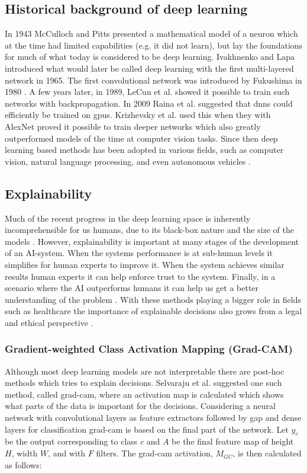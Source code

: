 \subsection{Historical background of deep learning} \label{sec:dl-history}
In 1943 McCulloch and Pitts \cite{McCulloch1943} presented a mathematical model of a neuron which at the time had limited capabilities (e.g. it did not learn), but lay the foundations for much of what today is considered to be deep learning. Ivakhnenko and Lapa \cite{Ivakhnenko1965} introduced what would later be called deep learning with the first multi-layered network in 1965. The first convolutional network was introduced by Fukushima in 1980 \cite{Fukushima1980}. A few years later, in 1989, LeCun et al. \cite{LeCun1989} showed it possible to train such networks with backpropagation. In 2009 Raina et al. \cite{Raina2009} suggested that \glspl{dnn} could efficiently be trained on \glspl{gpu}. Krizhevsky et al. \cite{Krizhevsky2012} used this when they with AlexNet proved it possible to train deeper networks which also greatly outperformed models of the time at computer vision tasks. Since then deep learning based methods has been adopted in various fields, such as computer vision, natural language processing, and even autonomous vehicles \cite{NazmusSaadat2020}.

\subsection{Explainability} \label{sec:explainability}
Much of the recent progress in the deep learning space is inherently incomprehensible for us humans, due to its black-box nature and the size of the models \cite{Du2018}. However, explainability is important at many stages of the development of an AI-system. When the systems performance is at sub-human levels it simplifies for human experts to improve it. When the system achieves similar results human experts it can help enforce trust to the system. Finally, in a scenario where the AI outperforms humans it can help us get a better understanding of the problem \cite{Selvaraju2016}. With these methods playing a bigger role in fields such as healthcare the importance of explainable decisions also grows from a legal and ethical perspective \cite{Amann2020}.

\subsubsection{Gradient-weighted Class Activation Mapping (Grad-CAM)} \label{sec:grad-cam}
Although most deep learning models are not interpretable there are post-hoc methods which tries to explain decisions. Selvaraju et al. \cite{Selvaraju2016} suggested one such method, called \gls{grad-cam}, where an activation map is calculated which shows what parts of the data is important for the decisions. Considering a neural network with convolutional layers as feature extractors followed by \gls{gap} and dense layers for classification \gls{grad-cam} is based on the final part of the network. Let $y_c$ be the output corresponding to class $c$ and $A$ be the final feature map of height $H$, width $W$, and with $F$ filters. The \gls{grad-cam} activation, $M_{GC}$, is then calculated as follows:

